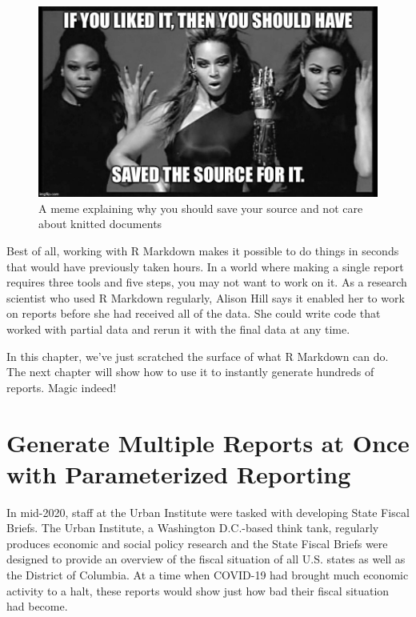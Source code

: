 \documentclass[
]{book}
\begin{document}
\begin{figure}
\includegraphics[width=1\linewidth]{assets/if-you-liked-it-you-should-have-saved-the-source-for-it} \caption{A meme explaining why you should save your source and not care about knitted documents}\label{fig:if-you-liked-it}
\end{figure}

Best of all, working with R Markdown makes it possible to do things in seconds that would have previously taken hours. In a world where making a single report requires three tools and five steps, you may not want to work on it. As a research scientist who used R Markdown regularly, Alison Hill says it enabled her to work on reports before she had received all of the data. She could write code that worked with partial data and rerun it with the final data at any time.

In this chapter, we've just scratched the surface of what R Markdown can do. The next chapter will show how to use it to instantly generate hundreds of reports. Magic indeed!

\hypertarget{parameterized-reports-chapter}{%
\chapter{Generate Multiple Reports at Once with Parameterized Reporting}\label{parameterized-reports-chapter}}

In mid-2020, staff at the Urban Institute were tasked with developing State Fiscal Briefs. The Urban Institute, a Washington D.C.-based think tank, regularly produces economic and social policy research and the State Fiscal Briefs were designed to provide an overview of the fiscal situation of all U.S. states as well as the District of Columbia. At a time when COVID-19 had brought much economic activity to a halt, these reports would show just how bad their fiscal situation had become.
\end{document}

